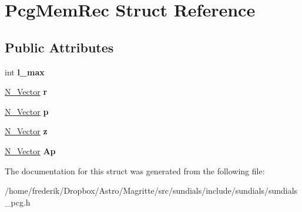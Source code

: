 \hypertarget{structPcgMemRec}{}\section{Pcg\+Mem\+Rec Struct Reference}
\label{structPcgMemRec}
\subsection*{Public Attributes}
\begin{DoxyCompactItemize}
\item 
\mbox{\label{structPcgMemRec_af8de1a03d3357925182b74ed29fd60b5}} 
int {\bfseries l\+\_\+max}
\item 
\mbox{\label{structPcgMemRec_ab2daa85a386cc7188c3ab134cbb88cbb}} 
\mbox{\hyperlink{struct__generic__N__Vector}{N\+\_\+\+Vector}} {\bfseries r}
\item 
\mbox{\label{structPcgMemRec_a7b4a3fe50e059666b057d6ab018e5f54}} 
\mbox{\hyperlink{struct__generic__N__Vector}{N\+\_\+\+Vector}} {\bfseries p}
\item 
\mbox{\label{structPcgMemRec_a07bf8d7792dffa0f989fc96e845223c3}} 
\mbox{\hyperlink{struct__generic__N__Vector}{N\+\_\+\+Vector}} {\bfseries z}
\item 
\mbox{\label{structPcgMemRec_a238a7f8dcf6eca2f7cf8a52268590409}} 
\mbox{\hyperlink{struct__generic__N__Vector}{N\+\_\+\+Vector}} {\bfseries Ap}
\end{DoxyCompactItemize}


The documentation for this struct was generated from the following file\+:\begin{DoxyCompactItemize}
\item 
/home/frederik/\+Dropbox/\+Astro/\+Magritte/src/sundials/include/sundials/sundials\+\_\+pcg.\+h\end{DoxyCompactItemize}
